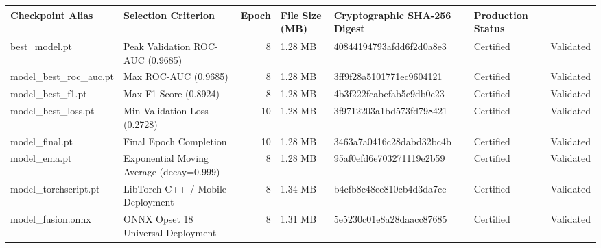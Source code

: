 \begin{tabular}{llrlll}
\toprule
Checkpoint Alias & Selection Criterion & Epoch & File Size (MB) & Cryptographic SHA-256 Digest & Production Status \\
\midrule
best_model.pt & Peak Validation ROC-AUC (0.9685) & 8 & 1.28 MB & 40844194793afdd6f2d0a8e3 & Certified & Validated \\
model_best_roc_auc.pt & Max ROC-AUC (0.9685) & 8 & 1.28 MB & 3ff9f28a5101771ec9604121 & Certified & Validated \\
model_best_f1.pt & Max F1-Score (0.8924) & 8 & 1.28 MB & 4b3f222fcabefab5e9db0e23 & Certified & Validated \\
model_best_loss.pt & Min Validation Loss (0.2728) & 10 & 1.28 MB & 3f9712203a1bd573fd798421 & Certified & Validated \\
model_final.pt & Final Epoch Completion & 10 & 1.28 MB & 3463a7a0416c28dabd32bc4b & Certified & Validated \\
model_ema.pt & Exponential Moving Average (decay=0.999) & 8 & 1.28 MB & 95af0efd6e703271119e2b59 & Certified & Validated \\
model_torchscript.pt & LibTorch C++ / Mobile Deployment & 8 & 1.34 MB & b4cfb8c48ee810cb4d3da7ce & Certified & Validated \\
model_fusion.onnx & ONNX Opset 18 Universal Deployment & 8 & 1.31 MB & 5e5230c01e8a28daacc87685 & Certified & Validated \\
\bottomrule
\end{tabular}
